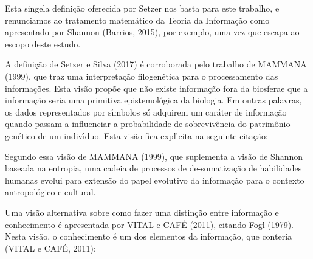\documentclass[
12pt,		%
openright,	%
twoside,  %
a4paper,			%
chapter=TITLE,		%
english,			%
french,				%
spanish,			%
brazil				%
]{USPSC-classe/USPSC}
\begin{document}
Esta singela defini\c{c}\~ao oferecida por Setzer nos basta para este trabalho, e renunciamos ao tratamento matem\'atico da Teoria da Informa\c{c}\~ao como apresentado por Shannon (Barrios, 2015), por exemplo, uma vez que escapa ao escopo deste estudo.









A defini\c{c}\~ao de Setzer e Silva (2017) \'e corroborada pelo trabalho de MAMMANA (1999), que traz uma interpreta\c{c}\~ao filogen\'etica para o processamento das informa\c{c}\~oes. Esta vis\~ao prop\~oe que \textquotedbl n\~ao existe informa\c{c}\~ao fora da biosfera\textquotedbl  e que a informa\c{c}\~ao seria uma primitiva epistemol\'ogica da biologia. Em outras palavras, os dados representados por s\'{\i}mbolos s\'o adquirem um car\'ater de informa\c{c}\~ao quando passam a influenciar a probabilidade de sobreviv\^encia do patrim\^onio gen\'etico de um indiv\'{\i}duo. Esta vis\~ao fica expl\'{\i}cita na seguinte cita\c{c}\~ao:










\noindent\begin{center}\mbox{\centering{}}\end{center}


Segundo essa vis\~ao de  MAMMANA (1999), que suplementa a vis\~ao de Shannon baseada na entropia, uma cadeia de processos de de-somatiza\c{c}\~ao de habilidades humanas evolui para extens\~ao do papel evolutivo da informa\c{c}\~ao para o contexto antropol\'ogico e cultural.









Uma vis\~ao alternativa sobre como fazer uma distin\c{c}\~ao entre informa\c{c}\~ao e conhecimento \'e apresentada por  VITAL e CAF\'E (2011), citando Fogl (1979). Nesta vis\~ao, o conhecimento \'e um dos elementos da informa\c{c}\~ao, que conteria (VITAL e CAF\'E, 2011):
\end{document}
